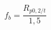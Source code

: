 \documentclass[12pt]{article}
\begin{document}
\begin{displaymath}
f_b=\frac{R_{p0,2/t}}{1,5}
\end{displaymath}
\end{document}
